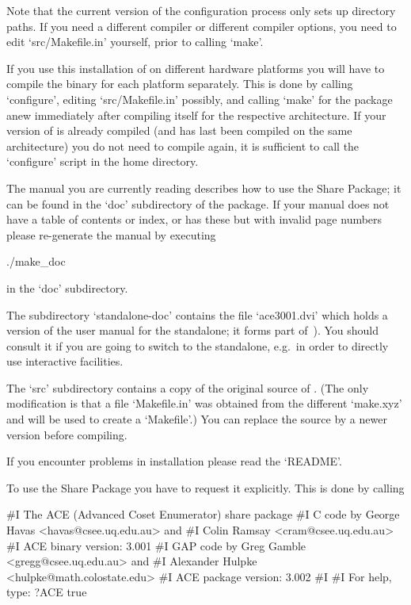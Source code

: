 Note that the  current version of the configuration  process only sets
up  directory paths.  If you  need a  different compiler  or different
compiler options, you need to edit `src/Makefile.in'  yourself,  prior
to calling `make'.

If you use this installation of {\GAP} on different hardware platforms
you will have to compile the binary for each platform separately. This
is done by calling `configure',  editing  `src/Makefile.in'  possibly,
and calling `make' for the package anew  immediately  after  compiling
{\GAP} itself for the respective  architecture.  If  your  version  of
{\GAP} is already compiled (and has last been  compiled  on  the  same
architecture)  you  do  not  need  to  compile  {\GAP}  again,  it  is
sufficient  to  call  the  `configure'  script  in  the  {\GAP}   home
directory.

The manual you are currently reading describes how to use  the  {\ACE}
Share Package; it can be  found  in  the  `doc'  subdirectory  of  the
package. If your manual does not have a table of contents or index, or
has these but with invalid page numbers please re-generate the  manual
by executing

\begintt
./make_doc
\endtt

in the `doc' subdirectory.

The  subdirectory  `standalone-doc'  contains the  file  `ace3001.dvi'
which holds a version of the user manual for the {\ACE} standalone; it
forms part of~\cite{Ram99}).  You  should consult it if  you are going
to  switch to  the {\ACE}  standalone, e.g.~in  order to  directly use
interactive facilities.

The  `src' subdirectory  contains a  copy  of the  original source  of
{\ACE}.  (The  only modification  is  that  a  file `Makefile.in'  was
obtained from  the different `make.xyz' and  will be used  to create a
`Makefile'.)  You  can replace  the source by  a newer  version before
compiling.

If you encounter problems in installation please read the `README'.


To use the {\ACE} Share Package you have  to  request  it  explicitly.
This is done by calling

\beginexample
#I    The ACE (Advanced Coset Enumerator) share package
#I    C code by George Havas <havas@csee.uq.edu.au> and
#I              Colin Ramsay <cram@csee.uq.edu.au>
#I                   ACE binary version: 3.001
#I    GAP code by Greg Gamble <gregg@csee.uq.edu.au> and
#I           Alexander Hulpke <hulpke@math.colostate.edu>
#I                   ACE package version: 3.002
#I  
#I                   For help, type: ?ACE
true
\endexample

